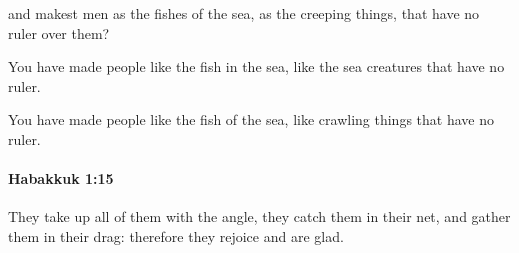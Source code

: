 			\begin{versebox}
					\item[BHS] 
					\item[LXX] 
					\item[ASV] and makest men as the fishes of the sea, as the creeping things, that have no ruler over them?
					\item[NIV] You have made people like the fish in the sea, like the sea creatures that have no ruler.
					\item[NRSV] You have made people like the fish of the sea, like crawling things that have no ruler.
			\end{versebox}

		\paragraph{Habakkuk 1:15} %
			\label{HABAKKUK-1-15}

			They take up all of them with the angle, they catch them in their net, and gather them in their drag: therefore they rejoice and are glad.

